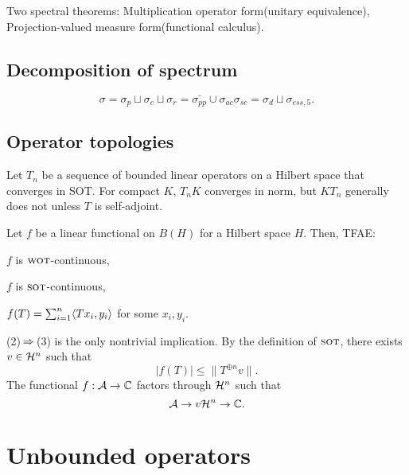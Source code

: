 \documentclass{../../large}
\newcommand{\wot}{{\text{\sc wot}}}
\newcommand{\sot}{{\text{\sc sot}}}
\begin{document}
Two spectral theorems: Multiplication operator form(unitary equivalence), Projection-valued measure form(functional calculus).


\section{Decomposition of spectrum}
\[\sigma=\sigma_p\sqcup\sigma_c\sqcup\sigma_r=\bar{\sigma_{pp}}\cup\sigma_{ac}\sigma_{sc}=\sigma_d\sqcup\sigma_{ess,5}.\]


\section{Operator topologies}


\begin{prb}
Let $T_n$ be a sequence of bounded linear operators on a Hilbert space that converges in SOT.
For compact $K$, $T_n K$ converges in norm, but $KT_n$ generally does not unless $T$ is self-adjoint.
\end{prb}

\begin{prb}
Let $f$ be a linear functional on $B(H)$ for a Hilbert space $H$.
Then, TFAE:
\begin{parts}
\item $f$ is $\wot$-continuous,
\item $f$ is $\sot$-continuous,
\item $f(T)=\sum_{i=1}^n\langle Tx_i,y_i\rangle$ for some $x_i,y_i$.
\end{parts}
\end{prb}
\begin{pf}
(2)$\impl$(3) is the only nontrivial implication.
By the definition of $\sot$, there exists $v\in \mathcal{H}^n$ such that
\[|f(T)|\le\|T^{\oplus n}v\|.\]
The functional $f:\mathcal{A}\to\mathbb{C}$ factors through $\mathcal{H}^n$ such that
\[\mathcal{A}\to{v}\mathcal{H}^n\to\mathbb{C}.\]
\end{pf}






\chapter{Unbounded operators}


\section{}

\begin{prb}
\end{prb}
\end{document}
